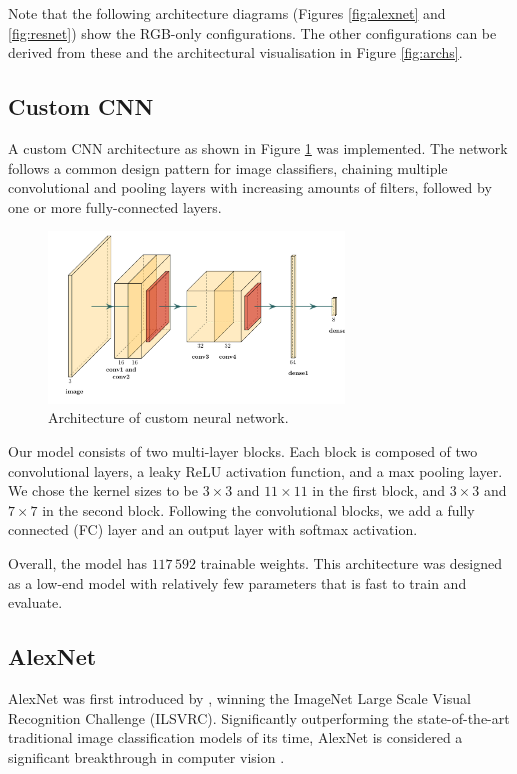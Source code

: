 \documentclass{l4proj}
\begin{document}
Note that the following architecture diagrams (Figures \ref{fig:alexnet} and \ref{fig:resnet}) show the RGB-only configurations. The other configurations can be derived from these and the architectural visualisation in Figure \ref{fig:archs}.

\subsection{Custom CNN}

A custom CNN architecture as shown in Figure \ref{fig:customnet} was implemented. The network follows a common design pattern for image classifiers, chaining multiple convolutional and pooling layers with increasing amounts of filters, followed by one or more fully-connected layers. 

\begin{figure}[ht]
  \centering
  \includegraphics[width=0.7\textwidth]{images/models/customnet}
  \caption{Architecture of custom neural network.}
  \label{fig:customnet}
\end{figure}

Our model consists of two multi-layer blocks. Each block is composed of two convolutional layers, a leaky ReLU activation function, and a max pooling layer. We chose the kernel sizes to be $3 \times 3$ and $11 \times 11$ in the first block, and $3 \times 3$ and $7 \times 7$ in the second block. Following the convolutional blocks, we add a fully connected (FC) layer and an output layer with softmax activation. 

Overall, the model has $117\,592$ trainable weights. This architecture was designed as a low-end model with relatively few parameters that is fast to train and evaluate.

\subsection{AlexNet}

AlexNet was first introduced by \citet{krizhevsky_imagenet_2012}, winning the ImageNet Large Scale Visual Recognition Challenge (ILSVRC). Significantly outperforming the state-of-the-art traditional image classification models of its time, AlexNet is considered a significant breakthrough in computer vision \citep{alom_history_2018}.
\end{document}
